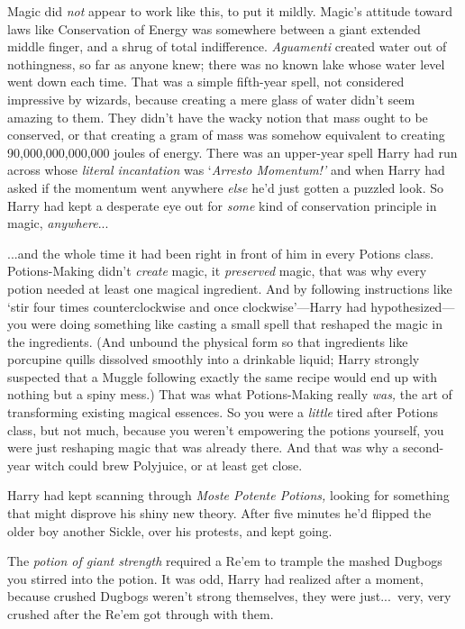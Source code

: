 Magic did \emph{not} appear to work like this, to put it mildly.
Magic’s attitude toward laws like Conservation of Energy was
somewhere between a giant extended middle finger, and a shrug of
total indifference. \emph{Aguamenti} created water out of
nothingness, so far as anyone knew; there was no known lake whose
water level went down each time. That was a simple fifth-year
spell, not considered impressive by wizards, because creating a
mere glass of water didn’t seem amazing to them. They didn’t have
the wacky notion that mass ought to be conserved, or that creating
a gram of mass was somehow equivalent to creating
90,000,000,000,000 joules of energy. There was an upper-year spell
Harry had run across whose \emph{literal incantation} was
‘\emph{Arresto Momentum!’} and when Harry had asked if the momentum
went anywhere \emph{else} he’d just gotten a puzzled look. So Harry
had kept a desperate eye out for \emph{some} kind of conservation
principle in magic, \emph{anywhere}...

...and the whole time it had been right in front of him in every
Potions class. Potions-Making didn’t \emph{create} magic, it
\emph{preserved} magic, that was why every potion needed at least
one magical ingredient. And by following instructions like ‘stir
four times counterclockwise and once clockwise’—Harry had
hypothesized—you were doing something like casting a small spell
that reshaped the magic in the ingredients. (And unbound the
physical form so that ingredients like porcupine quills dissolved
smoothly into a drinkable liquid; Harry strongly suspected that a
Muggle following exactly the same recipe would end up with nothing
but a spiny mess.) That was what Potions-Making really \emph{was,}
the art of transforming existing magical essences. So you were a
\emph{little} tired after Potions class, but not much, because you
weren’t empowering the potions yourself, you were just reshaping
magic that was already there. And that was why a second-year witch
could brew Polyjuice, or at least get close.

Harry had kept scanning through \emph{Moste Potente Potions,}
looking for something that might disprove his shiny new theory.
After five minutes he’d flipped the older boy another Sickle, over
his protests, and kept going.

The \emph{potion of giant strength} required a Re’em to trample
the mashed Dugbogs you stirred into the potion. It was odd, Harry
had realized after a moment, because crushed Dugbogs weren’t strong
themselves, they were just...\ very, very crushed after the Re’em
got through with them.

